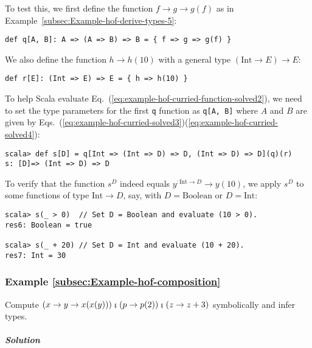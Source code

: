 To test this, we first define the function $f\rightarrow g\rightarrow g(f)$
as in Example~\ref{subsec:Example-hof-derive-types-5}:
\begin{lstlisting}
def q[A, B]: A => (A => B) => B = { f => g => g(f) }
\end{lstlisting}
We also define the function $h\rightarrow h(10)$ with a general type
$\left(\text{Int}\rightarrow E\right)\rightarrow E$:
\begin{lstlisting}
def r[E]: (Int => E) => E = { h => h(10) }
\end{lstlisting}
To help Scala evaluate Eq.~(\ref{eq:example-hof-curried-function-solved2}),
we need to set the type parameters for the first \lstinline!q! function
as \lstinline!q[A, B]! where $A$ and $B$ are given by Eqs.~(\ref{eq:example-hof-curried-solved3})\textendash (\ref{eq:example-hof-curried-solved4}):
\begin{lstlisting}
scala> def s[D] = q[Int => (Int => D) => D, (Int => D) => D](q)(r)
s: [D]=> (Int => D) => D
\end{lstlisting}
To verify that the function $s^{D}$ indeed equals $y^{:\text{Int}\rightarrow D}\rightarrow y(10)$,
we apply $s^{D}$ to some functions of type $\text{Int}\rightarrow D$,
say, with $D=\text{Boolean}$ or $D=\text{Int}$:
\begin{lstlisting}
scala> s(_ > 0)  // Set D = Boolean and evaluate (10 > 0).
res6: Boolean = true

scala> s(_ + 20) // Set D = Int and evaluate (10 + 20).
res7: Int = 30
\end{lstlisting}


\subsubsection{Example \label{subsec:Example-hof-composition}\ref{subsec:Example-hof-composition}}

Compute $\left(x\rightarrow y\rightarrow x(x(y))\right)\bef\left(p\rightarrow p(2)\right)\bef\left(z\rightarrow z+3\right)$
symbolically and infer types.

\subparagraph{Solution}

